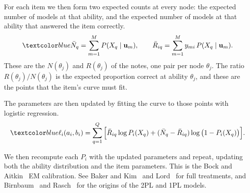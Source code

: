 For each item we then form two expected counts at every node: the expected number
of models at that ability, and the expected number of models at that ability that
answered the item correctly. 
\begin{equation}
  \aiadd{\bar{N}_q = \sum_{m=1}^{M} P(X_q \mid \mathbf{u}_m),
  \qquad
  \bar{R}_{iq} = \sum_{m=1}^{M} y_{mi}\, P(X_q \mid \mathbf{u}_m) .}
  \label{eq:expected-counts}
\end{equation}
These are the $N(\theta_j)$ and $R(\theta_j)$ of the notes, one pair per node
$\theta_j$. The ratio $R(\theta_j) / N(\theta_j)$ is the expected proportion
correct at ability $\theta_j$, and these are the points that the item's curve
must fit. 

The parameters are then updated by fitting the curve to those points with
logistic regression. 
\begin{equation}
  \aiadd{\ell_i(a_i, b_i)
  = \sum_{q=1}^{Q} \Big[ \bar{R}_{iq} \log P_i(X_q)
    + (\bar{N}_q - \bar{R}_{iq}) \log\big(1 - P_i(X_q)\big) \Big] .}
  \label{eq:mstep}
\end{equation}

We then recompute each $P_i$ with the updated parameters and repeat, updating both
the ability distribution and the item parameters. 
This is the Bock and Aitkin~\cite{bock1981marginal} EM calibration. See Baker and
Kim~\cite{baker2004item} and Lord~\cite{lord1980applications} for full
treatments, and Birnbaum~\cite{birnbaum1968some} and
Rasch~\cite{rasch1960probabilistic} for the origins of the 2PL and 1PL models.

